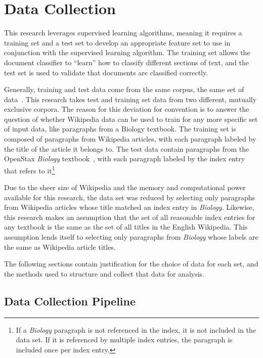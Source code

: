 \section{Data Collection}
\label{sec:data-collection}

This research leverages supervised learning algorithms, meaning it requires a training set and a test set to develop an appropriate feature set to use in conjunction with the supervised learning algorithm.
The training set allows the document classifier to ``learn'' how to classify different sections of text, and the test set is used to validate that documents are classified correctly.

Generally, training and test data come from the same corpus, the same set of data~\cite{jurafsky}.
This research takes test and training set data from two different, mutually exclusive corpora.
The reason for this deviation for convention is to answer the question of whether Wikipedia data can be used to train for any more specific set of input data, like paragraphs from a Biology textbook.
The training set is composed of paragraphs from Wikipedia articles, with each paragraph labeled by the title of the article it belongs to.
The test data contain paragraphs from the OpenStax {\it Biology} textbook~\cite{biology}, with each paragraph labeled by the index entry that refers to it\footnote{If a {\it Biology} paragraph is not referenced in the index, it is not included in the data set. If it is referenced by multiple index entries, the paragraph is included once per index entry.}

Due to the sheer size of Wikipedia and the memory and computational power available for this research, the data set was reduced by selecting only paragraphs from Wikipedia articles whose title matched an index entry in {\it Biology}.
Likewise, this research makes an assumption that the set of all reasonable index entries for any textbook is the same as the set of all titles in the English Wikipedia.
This assumption lends itself to selecting only paragraphs from {\it Biology} whose labels are the same as Wikipedia article titles.

The following sections contain justification for the choice of data for each set, and the methods used to structure and collect that data for analysis.

\subsection{Data Collection Pipeline}

